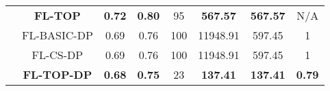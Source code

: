\documentclass[accepted]{uai2021} %
\begin{document}
\begin{table*}[!ht]
\begin{minipage}{.5\linewidth}
{\begin{tabular}{|c|c|c|c|c|c|c|c|}
        &  \textbf{FL-TOP} &  \textbf{0.72}  & \textbf{0.80} & 95 & \textbf{567.57} & \textbf{567.57} &N/A \\
        \cline{2-8}
        \cline{2-8}
        &  FL-BASIC-DP  & 0.69 & 0.76 & 100 & 11948.91 & 597.45 & 1 \\
        \cline{2-8}
        &  FL-CS-DP &  0.69  & 0.76 & 100 & 11948.91 & 597.45 & 1\\
        \cline{2-8}
        &  \textbf{FL-TOP-DP} & \textbf{0.68} & \textbf{0.75} & 23 & \textbf{137.41} & \textbf{137.41} & \textbf{0.79}\\
        \hline 
        \hline
        

\end{tabular}}
\end{minipage}
\end{table*}
\end{document}
